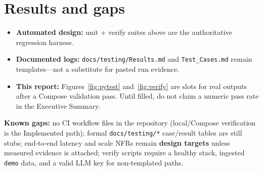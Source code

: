 \section{Results and gaps}

\begin{itemize}[leftmargin=*]
  \item \textbf{Automated design:} unit + verify suites above are the authoritative regression harness.
  \item \textbf{Documented logs:} \texttt{docs/testing/Results.md} and \texttt{Test\_Cases.md} remain templates---not a substitute for pasted run evidence.
  \item \textbf{This report:} Figures~\ref{fig:pytest} and~\ref{fig:verify} are slots for real outputs after a Compose validation pass. Until filled, do not claim a numeric pass rate in the Executive Summary.
\end{itemize}

\noindent
\textbf{Known gaps:} no CI workflow files in the repository (local/Compose verification is the Implemented path); formal \texttt{docs/testing/*} case/result tables are still stubs; end-to-end latency and scale NFRs remain \textbf{design targets} unless measured evidence is attached; verify scripts require a healthy stack, ingested \texttt{demo} data, and a valid LLM key for non-templated paths.
